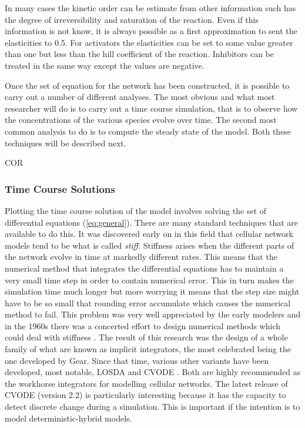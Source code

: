 In many cases the kinetic order can be estimate from other
information such has the degree of irreversibility and saturation
of the reaction. Even if this information is not know, it is always
possible as a first approximation to sent the elasticities to
0.5. For activators the elasticities can be set to some value
greater than one but less than the hill coefficient of the
reaction. Inhibitors can be treated in the same way except the
values are negative.

Once the set of equation for the network has been constructed, it
is possible to carry out a number of different analyses. The most
obvious and what most researcher will do is to carry out a time
course simulation, that is to observe how the concentrations of
the various species evolve over time. The second most common
analysis to do is to compute the steady state of the model. Both
these techniques will be described next.

COR

\subsubsection{Time Course Solutions}

Plotting the time course solution of the model involves solving
the set of differential equations (\ref{eq:general}). There are
many standard techniques that are available to do this. It was
discovered early on in this field that cellular network models
tend to be what is called {\em stiff}. Stiffness arises when the
different parts of the network evolve in time at markedly
different rates. This means that the numerical method that
integrates the differential equations has to maintain a very small
time step in order to contain numerical error. This in turn makes
the simulation time much longer but more worrying it means that
the step size might have to be so small that rounding error
accumulate which causes the numerical method to fail. This problem
was very well appreciated by the early modelers and in the 1960s
there was a concerted effort to design numerical methods which
could deal with stiffness \cite{Ga77}. The result of
this research was the design of a whole family of what are known
as implicit integrators, the most celebrated being the one
developed by Gear. Since that time, various other variants have
been developed, most notable, LOSDA and CVODE \cite{Cohen1996}.
Both are highly recommended as the workhorse integrators for
modelling cellular networks. The latest release of CVODE (version
2.2) is particularly interesting because it has the capacity to
detect discrete change during a simulation. This is important if
the intention is to model deterministic-hybrid models.


